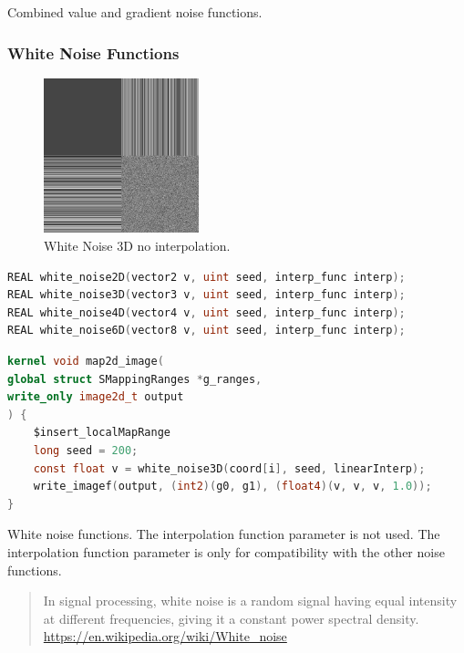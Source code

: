 Combined value and gradient noise functions.

\subsubsection{White Noise Functions}

\begin{figure}[h]
\centering
\includegraphics[width=0.4\textwidth]{out/noise_functions/white_noise3D_noInterp.png}
\caption{White Noise 3D no interpolation.}
\label{fig:white_noise3D_noInterp}
\end{figure}

\begin{lstlisting}[caption={Definition of white noise functions},label={lst:white_noise_definition},language=OpenCL]
REAL white_noise2D(vector2 v, uint seed, interp_func interp);
REAL white_noise3D(vector3 v, uint seed, interp_func interp);
REAL white_noise4D(vector4 v, uint seed, interp_func interp);
REAL white_noise6D(vector8 v, uint seed, interp_func interp);
\end{lstlisting}

\begin{lstlisting}[caption={Example for white noise functions},label={lst:white_noise_example},language=OpenCL]
kernel void map2d_image(
global struct SMappingRanges *g_ranges,
write_only image2d_t output
) {
    $insert_localMapRange
    long seed = 200;
    const float v = white_noise3D(coord[i], seed, linearInterp);
    write_imagef(output, (int2)(g0, g1), (float4)(v, v, v, 1.0));
}
\end{lstlisting}

White noise functions. The interpolation function parameter is not used.
The interpolation function parameter is only for compatibility with
the other noise functions.

\begin{quote}
In signal processing, white noise is a random signal having equal
intensity at different frequencies, giving it a constant power spectral density.
\url{https://en.wikipedia.org/wiki/White_noise}
\end{quote}

